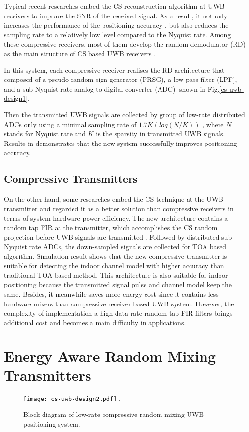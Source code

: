 Typical recent researches embed the CS reconstruction algorithm at UWB receivers to improve the SNR of the received signal. As a result, it not only increases the performance of the positioning accuracy \cite{banitalebi2014compressive}, but also reduces the sampling rate to a relatively low level compared to the Nyquist rate. Among these compressive receivers, most of them develop the random demodulator (RD) \cite{kirolos2006analog} as the main structure of CS based UWB receivers \cite{yang2011compressive}. 

In this system, each compressive receiver realises the RD architecture that composed of a pseudo-random sign generator (PRSG), a low pass filter (LPF), and a sub-Nyquist rate analog-to-digital converter (ADC), shown in Fig.\ref{cs-uwb-design1}. 

Then the transmitted UWB signals are collected by group of low-rate distributed ADCs only using a minimal sampling rate of $1.7K(log(N/K))$ \cite{kirolos2006analog}, where $N$ stands for Nyquist rate and $K$ is the sparsity in transmitted UWB signals. Results in \cite{yang2013compressive} demonstrates that the new system successfully improves positioning accuracy. 

\subsection{Compressive Transmitters}
\indent \indent On the other hand, some researches embed the CS technique at the UWB transmitter and regarded it as a better solution than compressive receivers in terms of  system hardware power efficiency. The new architecture contains a random tap FIR at the transmitter, which accomplishes the CS random projection before UWB signals are transmitted \cite{zhang2009compressed}. Followed by distributed sub-Nyquist rate ADCs, the down-sampled signals are collected for TOA based algorithm. Simulation result \cite{zhang2009compressed} shows that the new compressive transmitter is suitable for detecting the indoor channel model with higher accuracy than traditional TOA based method. This architecture is also suitable for indoor positioning because the transmitted signal pulse and channel model keep the same. Besides, it meanwhile saves more energy cost since it contains less hardware mixers than compressive receiver based UWB system. However, the complexity of implementation a high data rate random tap FIR filters brings additional cost and becomes a main difficulty in applications.

\section{Energy Aware Random Mixing Transmitters}
\begin{figure}[!t]
\centering
\texttt{[image: cs-uwb-design2.pdf]}
\DeclareGraphicsExtensions.
\caption{Block diagram of low-rate compressive random mixing UWB positioning system.}
\label{cs-uwb-design2}
\end{figure}

